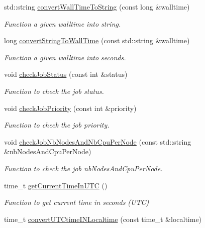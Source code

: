 \begin{DoxyCompactItemize}
std::string \hyperlink{namespacevishnu_ad5bea19658f717e721e13dacad591b2a}{convertWallTimeToString} (const long \&walltime)
\begin{DoxyCompactList}\small\item\em Function a given walltime into string. \item\end{DoxyCompactList}\item 
long \hyperlink{namespacevishnu_aed3383125fa0df584941fc4dac560e9e}{convertStringToWallTime} (const std::string \&walltime)
\begin{DoxyCompactList}\small\item\em Function a given walltime into seconds. \item\end{DoxyCompactList}\item 
void \hyperlink{namespacevishnu_a8460fc46c76d0b8e7efedbc571487d1f}{checkJobStatus} (const int \&status)
\begin{DoxyCompactList}\small\item\em Function to check the job status. \item\end{DoxyCompactList}\item 
void \hyperlink{namespacevishnu_aa59f3181383172b450f3621192c3ad26}{checkJobPriority} (const int \&priority)
\begin{DoxyCompactList}\small\item\em Function to check the job priority. \item\end{DoxyCompactList}\item 
void \hyperlink{namespacevishnu_a66c4f962fb018f2e5e89d81f06357ca3}{checkJobNbNodesAndNbCpuPerNode} (const std::string \&nbNodesAndCpuPerNode)
\begin{DoxyCompactList}\small\item\em Function to check the job nbNodesAndCpuPerNode. \item\end{DoxyCompactList}\item 
time\_\-t \hyperlink{namespacevishnu_a34810356a494e9db0e924c76889474b0}{getCurrentTimeInUTC} ()
\begin{DoxyCompactList}\small\item\em Function to get current time in seconds (UTC) \item\end{DoxyCompactList}\item 
time\_\-t \hyperlink{namespacevishnu_a912b9d87fc92812a07bb7f6dce8dcb85}{convertUTCtimeINLocaltime} (const time\_\-t \&localtime)

\end{DoxyCompactItemize}
